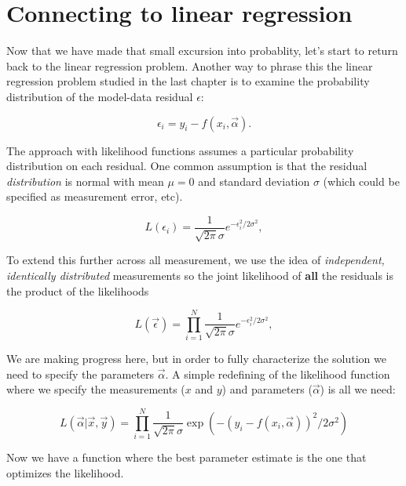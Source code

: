 \documentclass[
]{book}
\theoremstyle{definition}
\theoremstyle{definition}
\theoremstyle{definition}
\theoremstyle{remark}
\begin{document}
\hypertarget{connecting-to-linear-regression}{%
\section{Connecting to linear regression}\label{connecting-to-linear-regression}}

Now that we have made that small excursion into probablity, let's start to return back to the linear regression problem. Another way to phrase this the linear regression problem studied in the last chapter is to examine the probability distribution of the model-data residual \(\epsilon\):

\begin{equation}
\epsilon_{i} = y_{i} - f(x_{i},\vec{\alpha} ).
\end{equation}

The approach with likelihood functions assumes a particular probability distribution on each residual. One common assumption is that the residual \emph{distribution} is normal with mean \(\mu=0\) and standard deviation \(\sigma\) (which could be specified as measurement error, etc).

\begin{equation}
L(\epsilon_{i}) = \frac{1}{\sqrt{2 \pi} \sigma} e^{-\epsilon_{i}^{2} / 2 \sigma^{2} },
\end{equation}

To extend this further across all measurement, we use the idea of \emph{independent, identically distributed} measurements so the joint likelihood of \textbf{all} the residuals is the product of the likelihoods

\begin{equation}
L(\vec{\epsilon}) = \prod_{i=1}^{N} \frac{1}{\sqrt{2 \pi} \sigma} e^{-\epsilon_{i}^{2} / 2 \sigma^{2} },
\end{equation}

We are making progress here, but in order to fully characterize the solution we need to specify the parameters \(\vec{\alpha}\). A simple redefining of the likelihood function where we specify the measurements (\(x\) and \(y\)) and parameters (\(\vec{\alpha}\)) is all we need:

\begin{equation}
L(\vec{\alpha} | \vec{x},\vec{y} )= \prod_{i=1}^{N}  \frac{1}{\sqrt{2 \pi} \sigma} \exp(-(y_{i} - f(x_{i},\vec{\alpha} ))^{2} / 2 \sigma^{2} )  
\end{equation}

Now we have a function where the best parameter estimate is the one that optimizes the likelihood.
\end{document}
